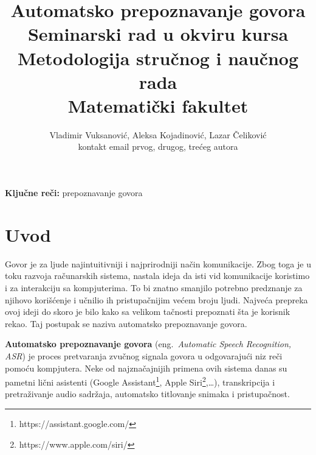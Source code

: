 \documentclass[a4paper]{article}
\begin{document}
\title{Automatsko prepoznavanje govora\\ \small{Seminarski rad u okviru kursa\\Metodologija stručnog i naučnog rada\\Matematički fakultet}}

\author{Vladimir Vuksanović, Aleksa Kojadinović, Lazar Čeliković\\kontakt email prvog, drugog, trećeg autora}


\maketitle


\bigskip
\textbf{Ključne reči:} prepoznavanje govora

\tableofcontents

\newpage

\section{Uvod}
\label{sec:uvod}

Govor je za ljude najintuitivniji i najprirodniji način komunikacije. 
Zbog toga je u toku razvoja računarskih sistema, nastala ideja da isti vid komunikacije koristimo i za interakciju sa kompjuterima.
To bi znatno smanjilo potrebno predznanje za njihovo korišćenje i učnilio ih pristupačnijim većem broju ljudi. 
Najveća prepreka ovoj ideji do skoro je bilo kako sa velikom tačnosti prepoznati šta je korisnik rekao.
Taj postupak se naziva automatsko prepoznavanje govora.

\textbf{Automatsko prepoznavanje govora} (eng.~{\em Automatic Speech Recognition, ASR}) je proces pretvaranja zvučnog signala govora u odgovarajući niz reči pomoću kompjutera.
Neke od najznačajnijih primena ovih sistema danas su pametni lični asistenti (Google Assistant\footnote{https://assistant.google.com/}, Apple Siri\footnote{https://www.apple.com/siri/},\dots), transkripcija i pretraživanje audio sadržaja, automatsko titlovanje snimaka i pristupačnost.
\end{document}
